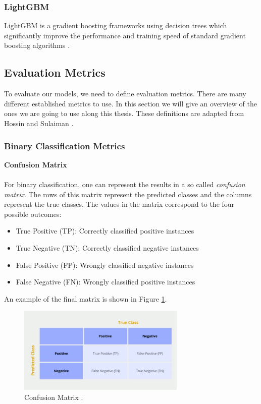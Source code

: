 \subsubsection{LightGBM}
LightGBM is a gradient boosting frameworks using decision trees which significantly improve the performance and training speed of standard gradient boosting algorithms \cite{lgbm}.

\subsection{Evaluation Metrics}
To evaluate our models, we need to define evaluation metrics. There are many different established metrics to use. In this section we will give an overview of the ones we are going to use along this thesis. These definitions are adapted from Hossin and Sulaiman \cite{metrics}.

\subsubsection{Binary Classification Metrics}

\textbf{Confusion Matrix} \\ \\
For binary classification, one can represent the results in a so called \textit{confusion matrix}. The rows of this matrix represent the predicted classes and the columns represent the true classes. The values in the matrix correspond to the four possible outcomes:
\begin{itemize}
	\item[\textbullet] True Positive (TP): Correctly classified positive instances
	\item[\textbullet] True Negative (TN): Correctly classified negative instances
	\item[\textbullet] False Positive (FP): Wrongly classified negative instances
	\item[\textbullet] False Negative (FN): Wrongly classified positive instances
\end{itemize}
An example of the final matrix is shown in Figure \ref{fig:confusion-matrix}.
\begin{figure}[h]
  \centering
  \includegraphics[width=8cm]{fig/confusion_matrix.png}
  \caption{Confusion Matrix \cite{confusion}.}%
  \label{fig:confusion-matrix}
\end{figure}

